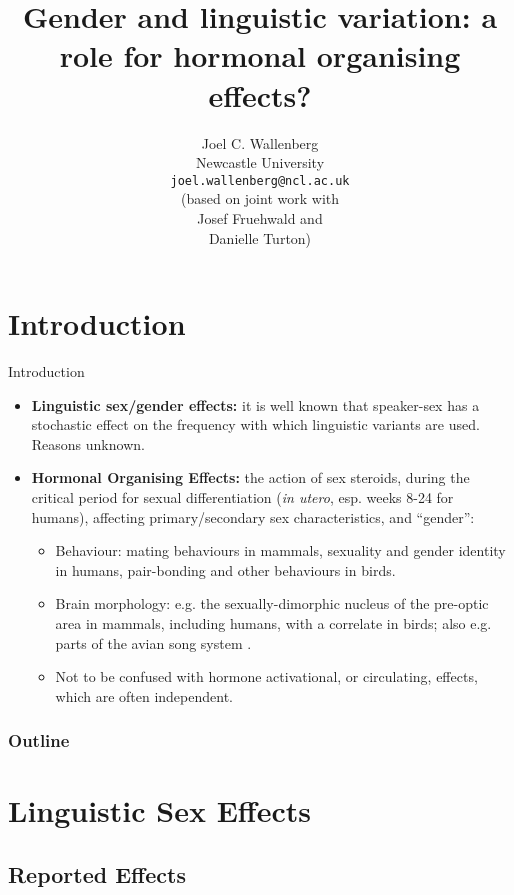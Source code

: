 \documentclass[hyperref={pdfpagelabels=false}]{beamer}
\title{Gender and linguistic variation: a role for hormonal organising effects?}
\author{Joel C. Wallenberg\\Newcastle University\\\texttt{joel.wallenberg@ncl.ac.uk}\\\vspace*{5mm}(based on joint work with \\Josef Fruehwald and \\Danielle Turton)}
\begin{document}
\begin{frame}[plain]
\titlepage
\end{frame}


\section{Introduction}
\begin{frame}{Introduction}

	
	\begin{itemize}
		\item \textbf{Linguistic sex/gender effects:} it is well known that speaker-sex has a stochastic effect on the frequency with which linguistic variants are used. Reasons unknown.
		\item \textbf{Hormonal Organising Effects:} the action of sex steroids, during the critical period for sexual differentiation 
		(\textsl{in utero}, esp. weeks 8-24 for humans), affecting primary/secondary sex characteristics, and ``gender'':
			\begin{itemize}
				\item Behaviour: mating behaviours in mammals, sexuality and gender identity in humans, pair-bonding and other behaviours in birds.
				\item Brain morphology: e.g. the sexually-dimorphic nucleus of the pre-optic area in mammals, including humans, with a correlate in birds; also e.g. parts of the avian song system \citep[][]{balthazartetal2009}.
				\item Not to be confused with hormone activational, or circulating, effects, which are often independent.
			\end{itemize}
	\end{itemize}
	
\end{frame}


\begin{frame}
\frametitle{Outline}
\tableofcontents
\end{frame}


\section{Linguistic Sex Effects}
\subsection{Reported Effects}
\end{document}
